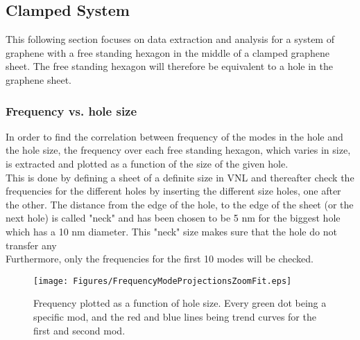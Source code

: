 \subsection{Clamped System}
This following section focuses on data extraction and analysis for a system of graphene with a free standing hexagon in the middle of a clamped graphene sheet. The free standing hexagon will therefore be equivalent to a hole in the graphene sheet.  
\subsubsection{Frequency vs. hole size}
In order to find the correlation between frequency of the modes in the hole and the hole size, the frequency over each free standing hexagon, which varies in size, is extracted and plotted as a function of the size of the given hole. \\
This is done by defining a sheet of a definite size in VNL and thereafter check the frequencies for the different holes by inserting the different size holes, one after the other. The distance from the edge of the hole, to the edge of the sheet (or the next hole) is called "neck" and has been chosen to be 5 nm for the biggest hole which has a 10 nm diameter. This "neck" size makes sure that the hole do not transfer any  \\
Furthermore, only the frequencies for the first 10 modes will be checked.
\begin{figure}
    \centering
    \texttt{[image: Figures/FrequencyModeProjectionsZoomFit.eps]}
    \caption{Frequency plotted as a function of hole size. Every green dot being a specific mod, and the red and blue lines being trend curves for the first and second mod.}
    \label{size vs frequency}
\end{figure}
